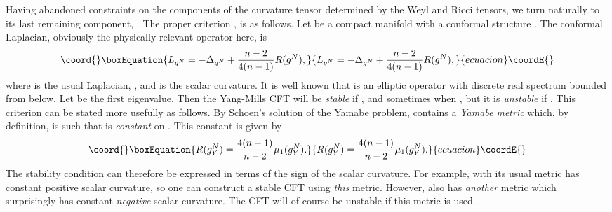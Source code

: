 \documentclass[a4paper,12pt]{article}
\theoremstyle{definition}
\renewcommand{\u}{\textit}
\renewcommand{\-}{\myHighlight{$\dfrac{\quad\enspace}{\quad}$}\coordHE{}}
\begin{document}
Having abandoned constraints on the components of the curvature tensor determined by the Weyl and Ricci tensors, we turn naturally to its last remaining component, \coordHE{}. The proper criterion \cite{3},\cite{6} is as follows. Let \coordHE{} be a compact manifold with a conformal structure \myHighlight{$[g^N]$}\coordHE{}. The conformal Laplacian, obviously the physically relevant operator here, is \cite{10}
\begin{equation}\coord{}\boxEquation{
L_{g^N}=-\Delta_{g^N} +\dfrac{n-2}{4(n-1)}R(g^N),
}{
L_{g^N}=-\Delta_{g^N} +\dfrac{n-2}{4(n-1)}R(g^N),
}{ecuacion}\coordE{}\end{equation}
where \coordHE{} is the usual Laplacian, \coordHE{}, and \coordHE{} is the scalar curvature. It is well known that \coordHE{} is an elliptic operator with discrete real spectrum bounded from below. Let \coordHE{} be the first eigenvalue. Then the Yang-Mills CFT will be \u{stable} if \coordHE{}, and sometimes when \coordHE{}, but it is \u{unstable} if \coordHE{}. This criterion can be stated more usefully as follows. By Schoen's solution \cite{11} of the Yamabe problem, \myHighlight{$[g^N]$}\coordHE{} contains a \u{Yamabe metric} \coordHE{} which, by definition, is such that \coordHE{} is \u{constant} on \coordHE{}. This constant is given by
\begin{equation}\coord{}\boxEquation{
R(g^N_Y)=\frac{4(n-1)}{n-2}\mu_1(g^N_Y).
}{
R(g^N_Y)=\frac{4(n-1)}{n-2}\mu_1(g^N_Y).
}{ecuacion}\coordE{}\end{equation}
The stability condition can therefore be expressed in terms of the sign of the scalar curvature. For example, \coordHE{} with its usual metric has constant positive scalar curvature, so one can construct a stable CFT using \u{this} metric. However, \coordHE{} also has \u{another} metric which \- surprisingly \- has constant \u{negative} scalar curvature. The CFT will of course be unstable if this metric is used. 
\end{document}
